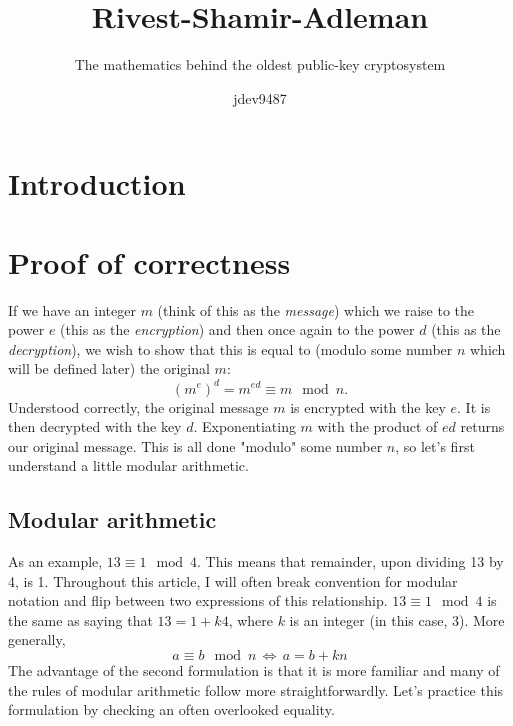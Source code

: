 \documentclass[]{scrartcl}
\author{jdev9487}
\title{Rivest-Shamir-Adleman}
\subtitle{The mathematics behind the oldest public-key cryptosystem}
\theoremstyle{definition}
\begin{document}
\maketitle

\tableofcontents
\pagebreak

\section{Introduction}

\section{Proof of correctness}
If we have an integer $m$ (think of this as the \textit{message}) which we raise to the power $e$ (this as the \textit{encryption}) and then once again to the power $d$ (this as the \textit{decryption}), we wish to show that this is equal to (modulo some number $n$ which will be defined later) the original $m$: 
\begin{equation}\label{eqn:statement}
    (m^e)^d = m^{ed} \equiv m \mod n.
\end{equation}
Understood correctly, the original message $m$ is encrypted with the key $e$. It is then decrypted with the key $d$. Exponentiating $m$ with the product of $ed$ returns our original message. This is all done "modulo" some number $n$, so let's first understand a little modular arithmetic.
\subsection{Modular arithmetic}
As an example, $13 \equiv 1 \mod 4$. This means that remainder, upon dividing 13 by 4, is 1. Throughout this article, I will often break convention for modular notation and flip between two expressions of this relationship. $13 \equiv 1 \mod 4$ is the same as saying that $13 = 1 + k4$, where $k$ is an integer (in this case, 3). More generally,
\begin{equation}
    a \equiv b \mod n \, \Leftrightarrow \, a = b + kn
\end{equation}
The advantage of the second formulation is that it is more familiar and many of the rules of modular arithmetic follow more straightforwardly. Let's practice this formulation by checking an often overlooked equality.
\end{document}
